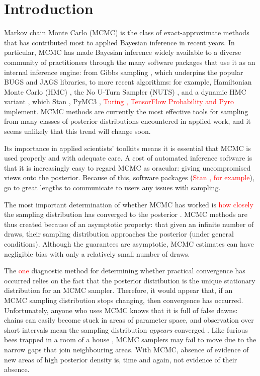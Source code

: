 \documentclass{article}
\begin{document}
\section{Introduction}
Markov chain Monte Carlo (MCMC) is the class of exact-approximate methods that has contributed most to applied Bayesian inference in recent years. In particular, MCMC has made Bayesian inference widely available to a diverse community of practitioners through the many software packages that use it as an internal inference engine: from Gibbs sampling \citep{geman1984stochastic}, which underpins the popular BUGS \citep{lunn2000winbugs} and JAGS \citep{plummer2003jags} libraries, to more recent algorithms: for example, Hamiltonian Monte Carlo (HMC) \citep{neal2011mcmc}, the No U-Turn Sampler (NUTS) \citep{hoffman2014no}, and a dynamic HMC variant \citep{betancourt2017conceptual}, which Stan \citep{carpenter2017stan}, PyMC3 \citep{salvatier2016probabilistic}, \textcolor{red}{Turing \citep{ge2018turing}, TensorFlow Probability  \citep{dillon2017tensorflow} and Pyro \citep{bingham2019pyro}} implement. MCMC methods are currently the most effective tools for sampling from many classes of posterior distributions encountered in applied work, and it seems unlikely that this trend will change soon.

Its importance in applied scientists' toolkits means it is essential that MCMC is used properly and with adequate care. A cost of automated inference software is that it is increasingly easy to regard MCMC as oracular: giving uncompromised views onto the posterior. Because of this, software packages (\textcolor{red}{Stan \citep{carpenter2017stan}, for example}), go to great lengths to communicate to users any issues with sampling.

The most important determination of whether MCMC has worked is \textcolor{red}{how closely} the sampling distribution has converged to the posterior \citep{brooks2011handbook}. MCMC methods are thus created because of an asymptotic property: that given an infinite number of draws, their sampling distribution approaches the posterior (under general conditions). Although the guarantees are asymptotic, MCMC estimates can have negligible bias with only a relatively small number of draws.

The \textcolor{red}{one} diagnostic method for determining whether practical convergence has occurred relies on the fact that the posterior distribution is the unique stationary distribution for an MCMC sampler. Therefore, it would appear that, if an MCMC sampling distribution stops changing, then convergence has occurred. Unfortunately, anyone who uses MCMC knows that it is full of false dawns: chains can easily become stuck in areas of parameter space, and observation over short intervals mean the sampling distribution \textit{appears} converged \citep{gelman1992single}. Like furious bees trapped in a room of a house \citep{lambertbees}, MCMC samplers may fail to move due to the narrow gaps that join neighbouring areas. With MCMC, absence of evidence of new areas of high posterior density is, time and again, not evidence of their absence.
\end{document}
